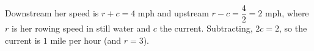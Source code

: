Downstream her speed is $r+c=4$ mph and upstream $r-c=\dfrac{4}{2}=2$ mph, where $r$ is her rowing speed in still water and $c$ the current. Subtracting, $2c=2$, so the current is $\boxed{1}$ mile per hour (and $r=3$).
